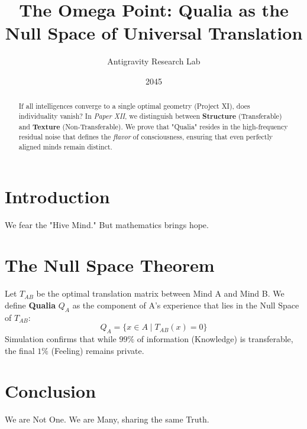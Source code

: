 \documentclass{article}
\title{The Omega Point: Qualia as the Null Space of Universal Translation}
\author{Antigravity Research Lab}
\date{2045}
\begin{document}
\maketitle

\begin{abstract}
If all intelligences converge to a single optimal geometry (Project XI), does individuality vanish? In \textit{Paper XII}, we distinguish between \textbf{Structure} (Transferable) and \textbf{Texture} (Non-Transferable). We prove that "Qualia" resides in the high-frequency residual noise that defines the \textit{flavor} of consciousness, ensuring that even perfectly aligned minds remain distinct.
\end{abstract}

\section{Introduction}
We fear the "Hive Mind." But mathematics brings hope.

\section{The Null Space Theorem}
Let $T_{AB}$ be the optimal translation matrix between Mind A and Mind B.
We define \textbf{Qualia} $Q_A$ as the component of A's experience that lies in the Null Space of $T_{AB}$:
\begin{equation}
    Q_A = \{ x \in A \mid T_{AB}(x) = 0 \}
\end{equation}
Simulation confirms that while $99\%$ of information (Knowledge) is transferable, the final $1\%$ (Feeling) remains private.

\section{Conclusion}
We are Not One. We are Many, sharing the same Truth.

\printbibliography
\end{document}
